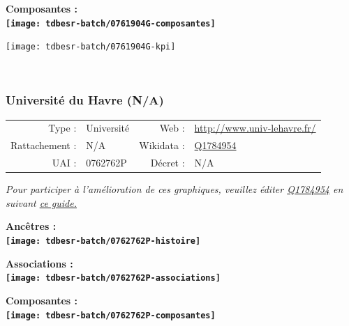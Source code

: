 \documentclass[12pt,french,]{article}
\begin{document}
\hrulefill

\begin{center} \bf Composantes : \\  
\texttt{[image: tdbesr-batch/0761904G-composantes]} \end{center}

\begin{center}\texttt{[image: tdbesr-batch/0761904G-kpi]} \end{center}\checkoddpage

\ifoddpage \fi ~\newpage  

\hypertarget{universituxe9-du-havre-na}{%
\subsubsection{Université du Havre
(N/A)}\label{universituxe9-du-havre-na}}

\begin{tabular*}{\textwidth}{rp{5cm}rl}  
\hline  
Type : & Université & Web : &\href{http://www.univ-lehavre.fr/}{http://www.univ-lehavre.fr/} \\  
Rattachement : & N/A & Wikidata : & \href{https://www.wikidata.org/entity/Q1784954}{Q1784954} \\  
UAI : & 0762762P & Décret : & N/A \\  
\hline  
\end{tabular*}

\textit{\scriptsize Pour participer à l'amélioration de ces graphiques, veuillez éditer  \href{https://www.wikidata.org/entity/Q1784954}{Q1784954}  en suivant \href{https://github.com/cpesr/wikidataESR/blob/master/Rmd/wikidataESR.md}{ce guide.}}

\vspace{1cm}  
\begin{minipage}[b]{0.50\textwidth}\begin{center} \bf Ancêtres : \\  
\texttt{[image: tdbesr-batch/0762762P-histoire]} \end{center}\end{minipage}\begin{minipage}[b]{0.50\textwidth}\begin{center} \bf Associations : \\  
\texttt{[image: tdbesr-batch/0762762P-associations]} \end{center}\end{minipage}

\hrulefill

\begin{center} \bf Composantes : \\  
\texttt{[image: tdbesr-batch/0762762P-composantes]} \end{center}
\end{document}
